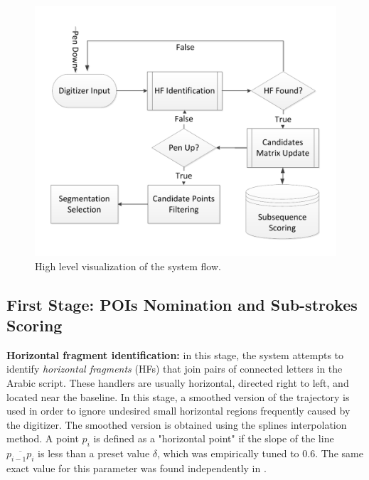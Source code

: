 \documentclass[10pt, conference, compsocconf]{IEEEtran}
\begin{document}
\begin{figure}
\centering
\includegraphics[width=1\columnwidth]{./figures/system_flow}
\caption{High level visualization of the system flow.}
\label{fig:system_flow}
\vspace{-15pt}
\end{figure}

\subsection{First Stage: POIs Nomination and Sub-strokes Scoring}

\textbf{Horizontal fragment identification:} in this stage, the system attempts to identify \emph{horizontal fragments} (HFs) that join pairs of connected letters in the Arabic script. 
These handlers are usually horizontal, directed right to left, and located near the baseline. 
In this stage, a smoothed version of the trajectory is used in order to ignore undesired small horizontal regions frequently caused by the digitizer. 
The smoothed version is obtained using the splines interpolation method.
A point $p_{i}$ is defined as a "horizontal point" if the slope of the line $\overline{p_{i-1}p_{i}}$ is less than a preset value $\delta$, which was empirically tuned to $0.6$. 
The same exact value for this parameter was found independently in \cite{daifallah2009recognition}.

\end{document}
